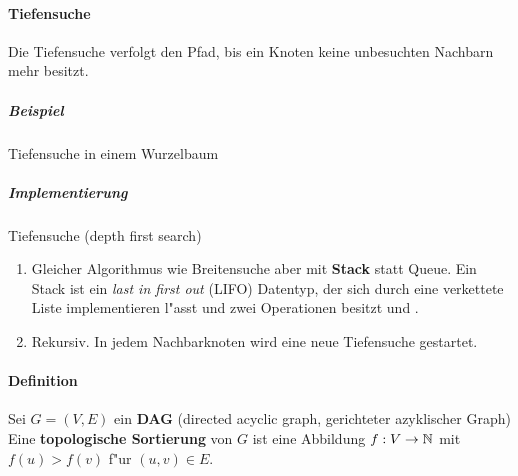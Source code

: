 \paragraph{Tiefensuche} \parskp
Die Tiefensuche verfolgt den Pfad, bis ein Knoten keine unbesuchten Nachbarn mehr besitzt.

\subparagraph{Beispiel} Tiefensuche in einem Wurzelbaum\\

\subparagraph{Implementierung} Tiefensuche (depth first search)
\begin{enumerate}
    \item Gleicher Algorithmus wie Breitensuche aber mit \textbf{Stack} statt Queue. Ein Stack ist ein
          \textit{last in first out} (LIFO) Datentyp, der sich durch eine verkettete Liste implementieren
          l"asst und zwei Operationen besitzt  und .
    \item Rekursiv. In jedem Nachbarknoten wird eine neue Tiefensuche gestartet.
\end{enumerate}

\paragraph{Definition} Sei $G=(V,E)$ ein \textbf{DAG} (directed acyclic graph, gerichteter azyklischer Graph)\\
Eine \textbf{topologische Sortierung} von $G$ ist eine Abbildung $f:V\rightarrow\mathbb{N}$ mit $f(u)>f(v)$ f"ur $(u,v)\in E$.
